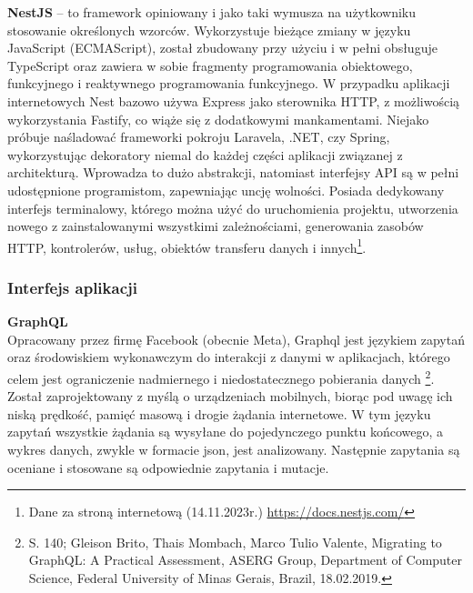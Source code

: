 \documentclass[12pt, a4paper, twoside, openany]{book}
\newcommand{\forceindent}{\leavevmode{\parindent=1.3em\indent}}
\begin{document}
\textbf{NestJS} -- to framework opiniowany i jako taki wymusza na użytkowniku stosowanie określonych wzorców.
Wykorzystuje bieżące zmiany w języku JavaScript (ECMAScript), został zbudowany przy użyciu i w pełni obsługuje TypeScript oraz zawiera w sobie fragmenty
programowania obiektowego, funkcyjnego i reaktywnego programowania funkcyjnego.
W przypadku aplikacji internetowych Nest bazowo używa Express jako sterownika HTTP,
z możliwością wykorzystania Fastify, co wiąże się z dodatkowymi mankamentami. Niejako próbuje naśladować frameworki pokroju Laravela,
.NET, czy Spring, wykorzystując dekoratory niemal do każdej części aplikacji związanej z architekturą. Wprowadza to dużo abstrakcji, natomiast interfejsy API są w pełni udostępnione programistom, zapewniając uncję wolności.
Posiada dedykowany interfejs terminalowy, którego można użyć do uruchomienia projektu,
utworzenia nowego z zainstalowanymi wszystkimi zależnościami, generowania zasobów HTTP,
kontrolerów, usług, obiektów transferu danych i innych\footnote{Dane za stroną internetową (14.11.2023r.) \url{https://docs.nestjs.com/}}.

\subsubsection{Interfejs aplikacji}

\forceindent \textbf{GraphQL}\\
\forceindent Opracowany przez firmę Facebook (obecnie Meta), Graphql jest językiem zapytań oraz środowiskiem wykonawczym do interakcji z danymi w aplikacjach, którego celem jest ograniczenie nadmiernego i niedostatecznego pobierania danych \footnote{S. 140; Gleison Brito, Thais Mombach, Marco Tulio Valente, Migrating to GraphQL: A Practical Assessment, ASERG Group, Department of Computer Science, Federal University of Minas Gerais, Brazil, 18.02.2019.}. Został zaprojektowany z myślą o urządzeniach mobilnych, biorąc pod uwagę ich niską prędkość, pamięć masową i drogie żądania internetowe.
W tym języku zapytań wszystkie żądania są wysyłane do pojedynczego punktu końcowego, a wykres danych, zwykle w formacie json, jest analizowany. Następnie zapytania są oceniane i stosowane są odpowiednie zapytania i mutacje.
\end{document}
